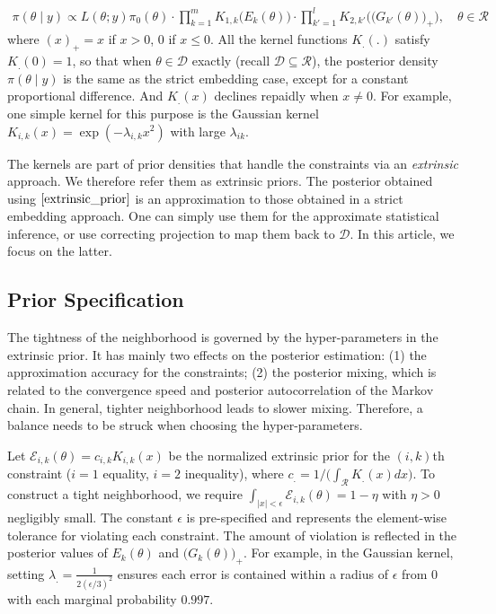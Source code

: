 \documentclass[10pt]{article}
\newcommand{\be}{\begin{equation}\begin{aligned}}
\newcommand{\ee}{\end{aligned}\end{equation}}
\newcommand{\mc}[1]{\mathcal{#1}}
\begin{document}
\be
\label{extrinsic_prior}
\pi(\theta \mid y) \propto L(\theta;y)\pi_0(\theta) \cdot \prod_{k=1}^{m} K_{1,k}\Big( E_k(\theta) \Big) \cdot \prod_{k'=1}^{l} K_{2,k'}\Big( \big( G_{k'}(\theta) \big)_+ \Big), \quad \theta \in \mc R
\ee
where $(x)_+ = x$ if $x>0$, $0$ if $x\le 0$. All the kernel functions $K_{.}(.)$ satisfy $K_{.}(0)=1$, so that when $\theta \in \mc D$ exactly (recall $\mc D \subseteq \mc R$), the posterior density $\pi(\theta\mid y)$ is the same as the strict embedding case, except for a constant proportional difference. And $K_.(x)$ declines repaidly when $x\ne 0$. For example, one simple kernel for this purpose is the Gaussian kernel $K_{i,k}(x) = \exp( -{\lambda_{i,k} x^2})$ with large $\lambda_{ik}$.

The kernels are part of prior densities that handle the constraints via an {\it extrinsic} approach. We therefore refer them as extrinsic priors. The posterior obtained using $\eqref{extrinsic_prior}$ is an approximation to those obtained in a strict embedding approach. One can simply use them for the approximate statistical inference, or use correcting projection to map them back to $\mc D$. In this article, we focus on the latter.


\subsection{Prior Specification}

The tightness of the neighborhood is governed by the hyper-parameters in the extrinsic prior. It has mainly two effects on the posterior estimation: (1) the approximation accuracy for the constraints; (2) the posterior mixing, which is related to the convergence speed and posterior autocorrelation of the Markov chain. In general, tighter neighborhood leads to slower mixing. Therefore, a balance needs to be struck when choosing the hyper-parameters. 

Let $\mc E_{i,k}(\theta)=c_{i,k}K_{i,k}(x)$ be the normalized extrinsic prior for the $(i,k)$th constraint ($i=1$ equality, $i=2$ inequality), where $c_.=1/\big( \int_{\mc R} K_{.}(x) dx \big)$. To construct a tight neighborhood, we require  $\int_{|x|<\epsilon} \mc E_{i,k}(\theta) = 1 -\eta$ with $\eta>0$ negligibly small. The constant $\epsilon$ is pre-specified and represents the element-wise tolerance for violating each constraint. The amount of violation is reflected in the posterior values of $E_k(\theta)$ and $\big(G_k(\theta)\big)_+$. For example, in the Gaussian kernel, setting $\lambda_. = \frac{1}{ 2(\epsilon/3)^2}$ ensures each error is contained within a radius of $\epsilon$ from $0$ with each marginal probability $0.997$.
\end{document}
